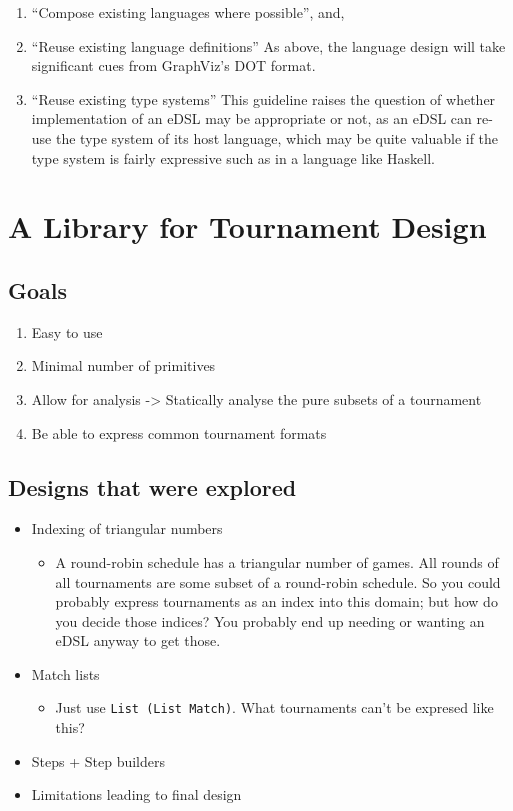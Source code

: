 \documentclass[a4,11pt,twoside,final]{article}
\begin{document}
\begin{enumerate}
\item ``Compose existing languages where possible'', and,
\item ``Reuse existing language definitions''
As above, the language design will take significant cues from GraphViz's DOT
format.

\item ``Reuse existing type systems''
This guideline raises the question of whether implementation of an eDSL may
be appropriate or not, as an eDSL can re-use the type system of its host
language, which may be quite valuable if the type system is fairly expressive
such as in a language like Haskell.
\end{enumerate}




\section{A Library for Tournament Design}
\label{sec:org81ca976}
\subsection{Goals}
\label{sec:orga4135e7}
\begin{enumerate}
\item Easy to use
\item Minimal number of primitives
\item Allow for analysis
-> Statically analyse the pure subsets of a tournament
\item Be able to express common tournament formats
\end{enumerate}

\subsection{Designs that were explored}
\label{sec:org99ba288}
\begin{itemize}
\item Indexing of triangular numbers
\begin{itemize}
\item A round-robin schedule has a triangular number of games. All rounds of all
tournaments are some subset of a round-robin schedule. So you could probably
express tournaments as an index into this domain; but how do you decide
those indices? You probably end up needing or wanting an eDSL anyway to get
those.
\end{itemize}
\item Match lists
\begin{itemize}
\item Just use \texttt{List (List Match)}. What tournaments can't be expresed like this?
\end{itemize}
\item Steps + Step builders
\item Limitations leading to final design
\end{itemize}
\end{document}

